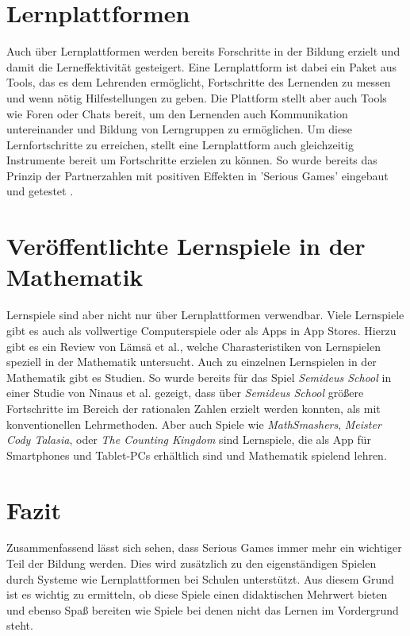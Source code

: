 \section{Lernplattformen}
Auch über Lernplattformen werden bereits Forschritte in der Bildung erzielt und damit die Lerneffektivität gesteigert. Eine Lernplattform ist dabei ein Paket aus Tools, das es dem Lehrenden ermöglicht, Fortschritte des Lernenden zu messen und wenn nötig Hilfestellungen zu geben. Die Plattform stellt aber auch Tools wie Foren oder Chats bereit, um den Lernenden auch Kommunikation untereinander und Bildung von Lerngruppen zu ermöglichen. Um diese Lernfortschritte zu erreichen, stellt eine Lernplattform auch gleichzeitig Instrumente bereit um Fortschritte erzielen zu können. So wurde bereits das Prinzip der Partnerzahlen mit positiven Effekten in 'Serious Games' eingebaut und getestet \cite{JUNG2015}.
\section{Veröffentlichte Lernspiele in der Mathematik}
Lernspiele sind aber nicht nur über Lernplattformen verwendbar. Viele Lernspiele gibt es auch als vollwertige Computerspiele oder als Apps in App Stores. Hierzu gibt es ein Review von Lämsä et al.\cite{Lamsa2018}, welche Charasteristiken von Lernspielen speziell in der Mathematik untersucht. Auch zu einzelnen Lernspielen in der Mathematik gibt es Studien. So wurde bereits für das Spiel \textit{Semideus School}\cite{semideus} in einer Studie von Ninaus et al.\cite{Ninaus2016} gezeigt, dass über \textit{Semideus School} größere Fortschritte im Bereich der rationalen Zahlen erzielt werden konnten, als mit konventionellen Lehrmethoden. Aber auch Spiele wie \textit{MathSmashers}\cite{ludoscience}, \textit{Meister Cody Talasia}\cite{meisterCody}, oder \textit{The Counting Kingdom}\cite{kingdom} sind Lernspiele, die als App für Smartphones und Tablet-PCs erhältlich sind und Mathematik spielend lehren.
\section{Fazit}
Zusammenfassend lässt sich sehen, dass Serious Games immer mehr ein wichtiger Teil der Bildung werden. Dies wird zusätzlich zu den eigenständigen Spielen durch Systeme wie Lernplattformen bei Schulen unterstützt. Aus diesem Grund ist es wichtig zu ermitteln, ob diese Spiele einen didaktischen Mehrwert bieten und ebenso Spaß bereiten wie Spiele bei denen nicht das Lernen im Vordergrund steht.